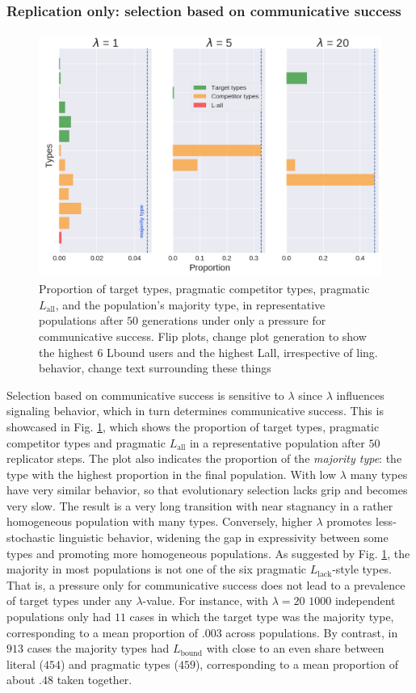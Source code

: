 \documentclass[a4paper, 11pt]{article}
\theoremstyle{Satz}
\newcommand{\hl}[1]{\textcolor[rgb]{.8,.33,.0}{#1}}%
\newcommand{\mylang}[1]{\ensuremath{L_{\text{#1}}}\xspace} %
\newcommand{\Lall}{\mylang{all}}
\newcommand{\Lbound}{\mylang{bound}}
\newcommand{\Llack}{\mylang{lack}}
\begin{document}
\subsubsection{Replication only: selection based on communicative success} 

\begin{figure}[t]
\centering
\includegraphics[width=\textwidth,height=8cm, keepaspectratio]{./plots/barh-onlyr}
\caption{Proportion of target types, \hl{pragmatic} competitor types, \hl{pragmatic} $\Lall$, and the population's majority type, in representative populations after $50$ generations under only a
  pressure for communicative success. \hl{Flip plots, change plot generation to show the highest 6 Lbound users and the highest Lall, irrespective of ling. behavior, change text surrounding these things}}
\label{fig:only-R}
\end{figure}

Selection based on communicative success is sensitive to $\lambda$ since $\lambda$
influences signaling behavior, which in turn determines communicative success. This is
showcased in Fig. \ref{fig:only-R}, which shows the proportion of target types, \hl{pragmatic} competitor types and \hl{pragmatic} $\Lall$ in a representative population after $50$ replicator steps. The plot also indicates the proportion of the
\emph{majority type}: the type with the highest proportion in the final population. With
low $\lambda$ many types have very similar behavior, so that evolutionary selection lacks grip
and becomes very slow. The result is a very long transition with near stagnancy in a rather
homogeneous population with many types. Conversely, higher $\lambda$ promotes 
less-stochastic linguistic behavior, widening the gap in expressivity between some types and
promoting more homogeneous populations. As suggested by Fig. \ref{fig:only-R}, the majority
in most populations is not one of the six pragmatic $\Llack$-style types. That is, a pressure
only for communicative success does not lead to a prevalence of target types under any
$\lambda$-value. For instance, with $\lambda = 20$ $1000$ independent populations only had $11$
cases in which the target type was the majority type, corresponding to a mean proportion of
$.003$ across populations. By contrast, in $913$ cases the majority types had $\Lbound$ with
close to an even share between literal ($454$) and pragmatic types ($459$), corresponding to a
mean proportion of about $.48$ taken together.
\end{document}
